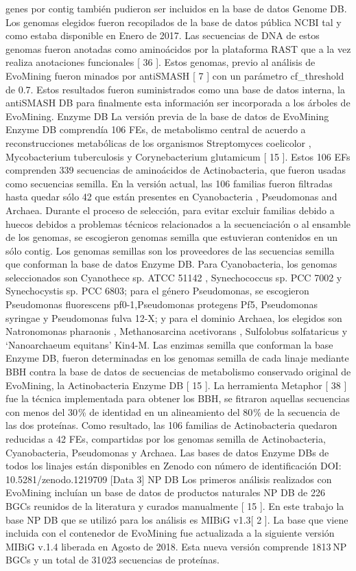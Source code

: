 \documentclass[12pt,twoside]{reedthesis}
\begin{document}
  genes por contig también pudieron ser incluidos en la base de datos
  Genome DB. Los genomas elegidos fueron recopilados de la base de datos
  pública NCBI tal y como estaba disponible en Enero de 2017. Las
  secuencias de DNA de estos genomas fueron anotadas como aminoácidos por
  la plataforma RAST que a la vez realiza anotaciones funcionales {[} 36
  {]}. Estos genomas, previo al análisis de EvoMining fueron minados por
  antiSMASH {[} 7 {]} con un parámetro cf\_threshold de 0.7. Estos
  resultados fueron suministrados como una base de datos interna, la
  antiSMASH DB para finalmente esta información ser incorporada a los
  árboles de EvoMining. Enzyme DB La versión previa de la base de datos de
  EvoMining Enzyme DB comprendía 106 FEs, de metabolismo central de
  acuerdo a reconstrucciones metabólicas de los organismos Streptomyces
  coelicolor , Mycobacterium tuberculosis y Corynebacterium glutamicum {[}
  15 {]}. Estos 106 EFs comprenden 339 secuencias de aminoácidos de
  Actinobacteria, que fueron usadas como secuencias semilla. En la versión
  actual, las 106 familias fueron filtradas hasta quedar sólo 42 que están
  presentes en Cyanobacteria , Pseudomonas and Archaea. Durante el proceso
  de selección, para evitar excluir familias debido a huecos debidos a
  problemas técnicos relacionados a la secuenciación o al ensamble de los
  genomas, se escogieron genomas semilla que estuvieran contenidos en un
  sólo contig. Los genomas semillas son los proveedores de las secuencias
  semilla que conforman la base de datos Enzyme DB. Para Cyanobacteria,
  los genomas seleccionados son Cyanothece sp. ATCC 51142 , Synechococcus
  sp. PCC 7002 y Synechocystis sp. PCC 6803; para el género Pseudomonas,
  se escogieron Pseudomonas fluorescens pf0-1,Pseudomonas protegens Pf5,
  Pseudomonas syringae y Pseudomonas fulva 12-X; y para el dominio
  Archaea, los elegidos son Natronomonas pharaonis , Methanosarcina
  acetivorans , Sulfolobus solfataricus y `Nanoarchaeum equitans' Kin4-M.
  Las enzimas semilla que conforman la base Enzyme DB, fueron determinadas
  en los genomas semilla de cada linaje mediante BBH contra la base de
  datos de secuencias de metabolismo conservado original de EvoMining, la
  Actinobacteria Enzyme DB {[} 15 {]}. La herramienta Metaphor {[} 38 {]}
  fue la técnica implementada para obtener los BBH, se fitraron aquellas
  secuencias con menos del 30 \% de identidad en un alineamiento del 80 \%
  de la secuencia de las dos proteínas. Como resultado, las 106 familias
  de Actinobacteria quedaron reducidas a 42 FEs, compartidas por los
  genomas semilla de Actinobacteria, Cyanobacteria, Pseudomonas y Archaea.
  Las bases de datos Enzyme DBs de todos los linajes están disponibles en
  Zenodo con número de identificación DOI: 10.5281/zenodo.1219709 {[}Data
  3{]} NP DB Los primeros análisis realizados con EvoMining incluían un
  base de datos de productos naturales NP DB de 226 BGCs reunidos de la
  literatura y curados manualmente {[} 15 {]}. En este trabajo la base NP
  DB que se utilizó para los análisis es MIBiG v1.3{[} 2 {]}. La base que
  viene incluida con el contenedor de EvoMining fue actualizada a la
  siguiente versión MIBiG v.1.4 liberada en Agosto de 2018. Esta nueva
  versión comprende 1813 NP BGCs y un total de 31 023 secuencias de
  proteínas.
  
\end{document}
